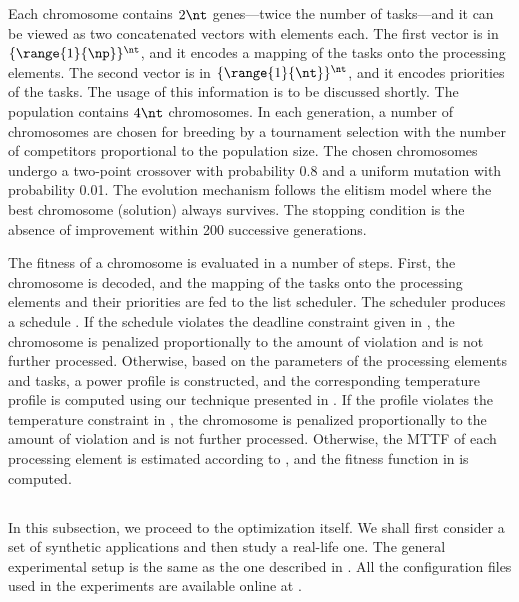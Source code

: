 Each chromosome contains $2 \nt$ genes---twice the number of tasks---and it can
be viewed as two concatenated vectors with \nt elements each. The first vector
is in $\{ \range{1}{\np} \}^\nt$, and it encodes a mapping of the tasks onto the
processing elements. The second vector is in $\{ \range{1}{\nt} \}^\nt$, and it
encodes priorities of the tasks. The usage of this information is to be
discussed shortly. The population contains $4 \nt$ chromosomes. In each
generation, a number of chromosomes are chosen for breeding by a tournament
selection with the number of competitors proportional to the population size.
The chosen chromosomes undergo a two-point crossover with probability 0.8 and a
uniform mutation with probability 0.01. The evolution mechanism follows the
elitism model where the best chromosome (solution) always survives. The stopping
condition is the absence of improvement within 200 successive generations.

The fitness of a chromosome is evaluated in a number of steps. First, the
chromosome is decoded, and the mapping of the tasks onto the processing elements
and their priorities are fed to the list scheduler. The scheduler produces a
schedule \schedule. If the schedule violates the deadline constraint given in
, the chromosome is penalized proportionally
to the amount of violation and is not further processed. Otherwise, based on the
parameters of the processing elements and tasks, a power profile \mp is
constructed, and the corresponding temperature profile \mq is computed using our
technique presented in . If the profile
violates the temperature constraint in , the
chromosome is penalized proportionally to the amount of violation and is not
further processed. Otherwise, the \ac{MTTF} of each processing element is
estimated according to , and the fitness
function in  is computed.

\subsection{\resultstitle}

In this subsection, we proceed to the optimization itself. We shall first
consider a set of synthetic applications and then study a real-life one. The
general experimental setup is the same as the one described in
. All the configuration files used in the
experiments are available online at \cite{eslab2012}.


